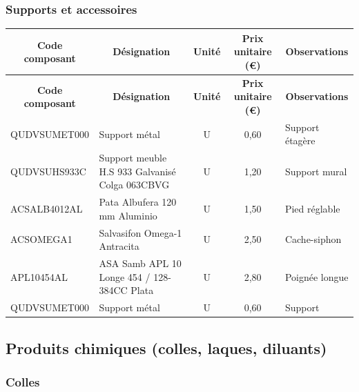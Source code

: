 \documentclass[12pt,a4paper]{article}
\begin{document}
\subsubsection{Supports et accessoires}

\begin{longtable}{|p{4cm}|p{6cm}|c|c|p{3cm}|}
\hline
\multicolumn{1}{|c|}{\textbf{Code composant}} & \multicolumn{1}{c|}{\textbf{Désignation}} & \multicolumn{1}{c|}{\textbf{Unité}} & \multicolumn{1}{c|}{\textbf{Prix unitaire (€)}} & \multicolumn{1}{c|}{\textbf{Observations}} \\
\hline
\endfirsthead
\hline
\multicolumn{1}{|c|}{\textbf{Code composant}} & \multicolumn{1}{c|}{\textbf{Désignation}} & \multicolumn{1}{c|}{\textbf{Unité}} & \multicolumn{1}{c|}{\textbf{Prix unitaire (€)}} & \multicolumn{1}{c|}{\textbf{Observations}} \\
\hline
\endhead
\hline
\endfoot
QUDVSUMET000 & Support métal & U & 0,60 & Support étagère \\
QUDVSUHS933C & Support meuble H.S 933 Galvanisé Colga 063CBVG & U & 1,20 & Support mural \\
ACSALB4012AL & Pata Albufera 120 mm Aluminio & U & 1,50 & Pied réglable \\
ACSOMEGA1 & Salvasifon Omega-1 Antracita & U & 2,50 & Cache-siphon \\
APL10454AL & ASA Samb APL 10 Longe 454 / 128-384CC Plata & U & 2,80 & Poignée longue \\
QUDVSUMET000 & Support métal & U & 0,60 & Support \\
\hline
\end{longtable}

\subsection{Produits chimiques (colles, laques, diluants)}

\subsubsection{Colles}
\end{document}
